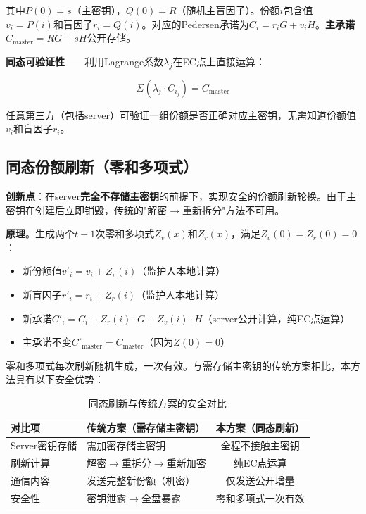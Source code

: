 \documentclass[UTF8,a4paper,zihao=-4,openany]{ctexrep}
\begin{document}
其中$P(0) = s$（主密钥），$Q(0) = R$（随机主盲因子）。份额$i$包含值$v_i = P(i)$和盲因子$r_i = Q(i)$。对应的Pedersen承诺为$C_i = r_iG + v_iH$。\textbf{主承诺}$C_{\text{master}} = RG + sH$公开存储。

\noindent \textbf{同态可验证性}——利用Lagrange系数$\lambda_j$在EC点上直接运算：

\[
\Sigma(\lambda_j \cdot C_{i_j}) = C_{\text{master}}
\]

任意第三方（包括server）可验证一组份额是否正确对应主密钥，无需知道份额值$v_i$和盲因子$r_i$。

\subsection{同态份额刷新（零和多项式）}

\textbf{创新点}：在server\textbf{完全不存储主密钥}的前提下，实现安全的份额刷新轮换。由于主密钥在创建后立即销毁，传统的"解密$\to$重新拆分"方法不可用。

\noindent \textbf{原理}。生成两个$t-1$次零和多项式$Z_v(x)$和$Z_r(x)$，满足$Z_v(0) = Z_r(0) = 0$：

\begin{itemize}
  \item 新份额值$v'_i = v_i + Z_v(i)$（监护人本地计算）
  \item 新盲因子$r'_i = r_i + Z_r(i)$（监护人本地计算）
  \item 新承诺$C'_i = C_i + Z_r(i)\cdot G + Z_v(i)\cdot H$（server公开计算，纯EC点运算）
  \item 主承诺不变$C'_{\text{master}} = C_{\text{master}}$（因为$Z(0) = 0$）
\end{itemize}

零和多项式每次刷新随机生成，一次有效。与需存储主密钥的传统方案相比，本方法具有以下安全优势：

\begin{table}[H]
\centering
\caption{同态刷新与传统方案的安全对比}
\begin{tabularx}{\textwidth}{lXc}
\toprule
对比项 & 传统方案（需存储主密钥） & 本方案（同态刷新）\\
\midrule
Server密钥存储 & 需加密存储主密钥 & 全程不接触主密钥\\
刷新计算 & 解密$\to$重拆分$\to$重新加密 & 纯EC点运算\\
通信内容 & 发送完整新份额（机密） & 仅发送公开增量\\
安全性 & 密钥泄露$\to$全盘暴露 & 零和多项式一次有效\\
\bottomrule
\end{tabularx}
\end{table}
\end{document}
